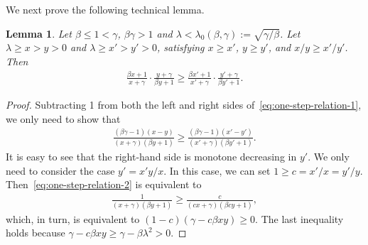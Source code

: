 \documentclass[11pt]{amsart}
\newcommand{\defeq}{:=}
\newtheorem{lemma}[theorem]{Lemma}
\theoremstyle{definition}
\theoremstyle{remark}
\begin{document}
We next prove the following technical lemma.
\begin{lemma}\label{lemma:one-step-relation-preserve}
Let $\beta \leq 1 < \gamma$, $\beta\gamma > 1$ and $\lambda < \lambda_0(\beta,\gamma) \defeq \sqrt{\gamma/\beta}$.
Let $\lambda\geq x>y>0$ and $\lambda\geq x'>y'>0$, satisfying $x\geq x'$, $y\geq y'$, and $x/y\geq x'/y'$. Then 
\begin{align}\label{eq:one-step-relation-1}
\frac{\beta x + 1}{x + \gamma} \cdot \frac{y + \gamma}{\beta y + 1} \geq \frac{\beta x' + 1}{x' + \gamma} \cdot \frac{y' + \gamma}{\beta y' + 1}.
\end{align}
\end{lemma}

\begin{proof}
Subtracting 1 from both the left and right sides of~\eqref{eq:one-step-relation-1}, we only need to show that
\begin{align}\label{eq:one-step-relation-2}
\frac{(\beta\gamma-1)(x-y)}{(x + \gamma)(\beta y + 1)} \geq \frac{(\beta\gamma-1)(x'-y')}{(x' + \gamma)(\beta y' + 1)}.
\end{align}
It is easy to see that the right-hand side is monotone decreasing in $y'$. We only need to consider the case $y'=x'y/x$. In this case, we can set $1\ge c=x'/x=y'/y$.
Then~\eqref{eq:one-step-relation-2} is equivalent to
\begin{align*}
\frac{1}{(x + \gamma)(\beta y + 1)} \geq \frac{c}{(cx + \gamma)(\beta cy + 1)},
\end{align*}
which, in turn, is equivalent to $ (1-c)(\gamma-c\beta xy)\geq 0$.
The last inequality holds because $\gamma-c\beta xy \geq \gamma - \beta \lambda^2 > 0$.
\end{proof}
\end{document}

